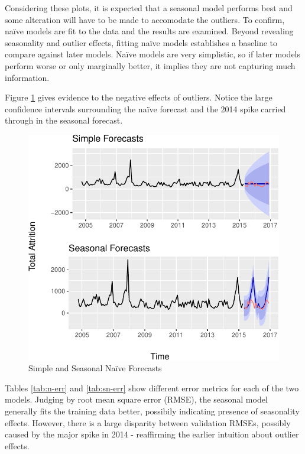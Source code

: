 \documentclass[12pt,letterpaper,toc=flat,oneside]{report}
\theoremstyle{definition}
\theoremstyle{definition}
\theoremstyle{definition}
\theoremstyle{remark}
\begin{document}
Considering these plots, it is expected that a seasonal model performs
best and some alteration will have to be made to accomodate the
outliers. To confirm, naïve models are fit to the data and the results
are examined. Beyond revealing seasonality and outlier effects, fitting
naïve models establishes a baseline to compare against later models.
Naïve models are very simplistic, so if later models perform worse or
only marginally better, it implies they are not capturing much
information.

Figure \ref{fig:n-sn-forecast} gives evidence to the negative effects of
outliers. Notice the large confidence intervals surrounding the naïve
forecast and the 2014 spike carried through in the seasonal forecast.

\begin{figure}[H]

{\centering \includegraphics{elliott-econometric-personnel-retention-18_files/figure-latex/n-sn-forecast-1} 

}

\caption{Simple and Seasonal Na\"ive Forecasts}\label{fig:n-sn-forecast}
\end{figure}

Tables \ref{tab:n-err} and \ref{tab:sn-err} show different error metrics
for each of the two models. Judging by root mean square error (RMSE),
the seasonal model generally fits the training data better, possibily
indicating presence of seasonality effects. However, there is a large
disparity between validation RMSEs, possibly caused by the major spike
in 2014 - reaffirming the earlier intuition about outlier effects.
\end{document}

